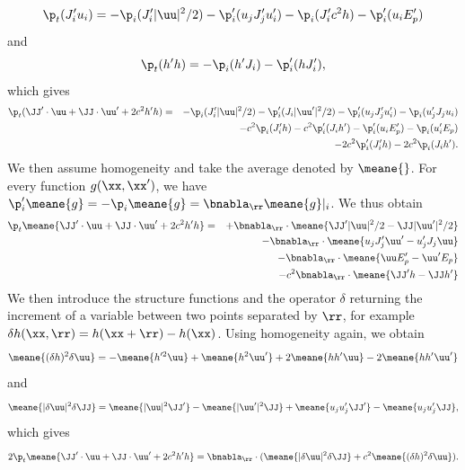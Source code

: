 \begin{equation}
\p_t ( J_i' u_i ) = - \p_i( J_i'|\uu|^2/2) - \p_i'(u_j J_j' u_i')
-\p_i (J_i' c^2 h)  - \p_i' (u_i E_p')
\end{equation}
and
\begin{equation}
\p_t ( h' h ) = - \p_i( h'J_i ) - \p_i'( hJ_i' ),
\end{equation}
which gives
\begin{eqnarray}
\p_t ( \JJ'\cdot\uu + \JJ\cdot\uu' + 2c^2 h'h )
&=& - \p_i( J_i'|\uu|^2/2) - \p_i'( J_i|\uu'|^2/2) %
- \p_i'(u_j J_j' u_i') - \p_i(u_j' J_j u_i) \nonumber\\
&& -c^2\p_i (J_i'h) - c^2\p_i' (J_ih') %
- \p_i' (u_i E_p') - \p_i (u_i' E_p) \nonumber\\
&& -2c^2\p_i' (J_i'h) - 2c^2\p_i (J_ih').
\end{eqnarray}
We then assume homogeneity and take the average denoted by
$\meane{}$.   For
every function $g(\xx, \xx')$, we have $\p_i' \meane{g} =
-\p_i\meane{g} = \bnabla_{\rr} \meane{g}|_i$. We thus obtain
\begin{eqnarray}
\p_t \meane{ \JJ'\cdot\uu + \JJ\cdot\uu' + 2c^2 h'h }
&=& + \bnabla_{\rr}\cdot\meane{ \JJ'|\uu|^2/2 - \JJ|\uu'|^2/2 } \nonumber\\
&& - \bnabla_{\rr}\cdot\meane{ u_j J_j' \uu' - u_j' J_j \uu } \nonumber\\
&& - \bnabla_{\rr}\cdot\meane{ \uu E_p'- \uu' E_p } \nonumber\\
&& -c^2\bnabla_{\rr}\cdot\meane{ \JJ'h - \JJ h' }
\end{eqnarray}
%
We then introduce the structure functions and the operator $\delta$
returning the increment of a variable between two points separated by $\rr$, 
for example $\delta h (\xx, \rr) = h(\xx+\rr)- h(\xx)$.
%
Using homogeneity again, we obtain
\begin{equation}
\meane{ (\delta h)^2 \delta\uu } = 
-\meane{ h'^2 \uu } + \meane{ h^2 \uu' }
+2\meane{ hh' \uu } - 2\meane{ hh' \uu' }
\end{equation}
and 
\begin{equation}
\meane{ |\delta \uu|^2 \delta\JJ } = 
\meane{  |\uu|^2 \JJ' } - \meane{ |\uu'|^2\JJ }
+\meane{ u_ju_j' \JJ' } - \meane{  u_ju_j' \JJ },
\end{equation}
which gives
\begin{equation} \label{FluxT}
2\p_t \meane{ \JJ'\cdot\uu + \JJ\cdot\uu' + 2c^2 h'h }
= \bnabla_{\rr} \cdot ( \meane{ |\delta \uu|^2 \delta\JJ } 
+ c^2\meane{ (\delta h)^2 \delta\uu } ).
\end{equation}
